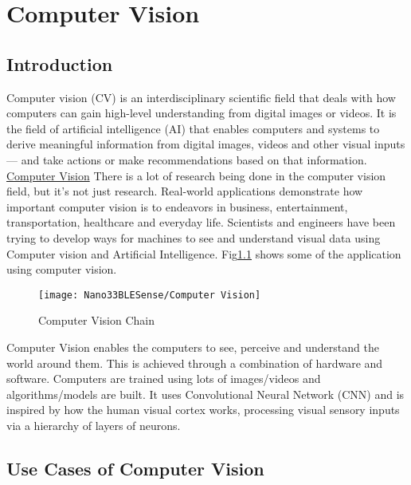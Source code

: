 %
%


\chapter{Computer Vision}

\section{Introduction}

Computer vision (CV) is an interdisciplinary scientific field that deals with how computers can gain high-level understanding from digital images or videos. It is the field of artificial intelligence (AI) that enables computers and systems to derive meaningful information from digital images, videos and other visual inputs — and take actions or make recommendations based on that information. \href{https://bit.ly/3iAQkv7}{Computer Vision} There is a lot of research being done in the computer vision field, but it’s not just research. Real-world applications demonstrate how important computer vision is to endeavors in business, entertainment, transportation, healthcare and everyday life. Scientists and engineers have been trying to develop ways for machines to see and understand visual data using Computer vision and Artificial Intelligence. Fig\ref{Computer Vision Chain} shows some of the application using computer vision.


\begin{figure}[h]
	\centering
	\texttt{[image: Nano33BLESense/Computer Vision]}
	\caption{Computer Vision Chain}
	\label{Computer Vision Chain}
\end{figure}

Computer Vision enables the computers to see, perceive and understand the world around them. This is achieved through a combination of hardware and software. Computers are trained using lots of images/videos and algorithms/models are built. It uses Convolutional Neural Network (CNN) and is inspired by how the human visual cortex works, processing visual sensory inputs via a hierarchy of layers of neurons.

\section{Use Cases of Computer Vision}

